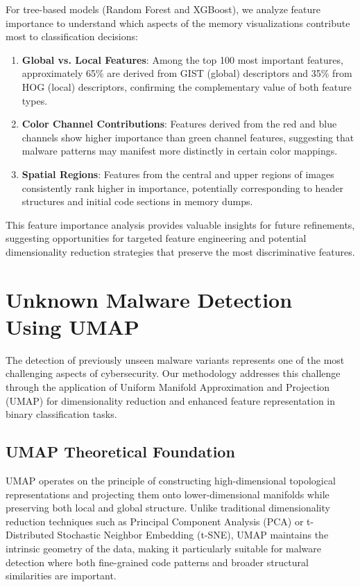 For tree-based models (Random Forest and XGBoost), we analyze feature importance to understand which aspects of the memory visualizations contribute most to classification decisions:

\begin{enumerate}
    \item \textbf{Global vs. Local Features}: Among the top 100 most important features, approximately 65\% are derived from GIST (global) descriptors and 35\% from HOG (local) descriptors, confirming the complementary value of both feature types.
    
    \item \textbf{Color Channel Contributions}: Features derived from the red and blue channels show higher importance than green channel features, suggesting that malware patterns may manifest more distinctly in certain color mappings.
    
    \item \textbf{Spatial Regions}: Features from the central and upper regions of images consistently rank higher in importance, potentially corresponding to header structures and initial code sections in memory dumps.
\end{enumerate}

This feature importance analysis provides valuable insights for future refinements, suggesting opportunities for targeted feature engineering and potential dimensionality reduction strategies that preserve the most discriminative features.

\section{Unknown Malware Detection Using UMAP}
\label{sec:umap-detection}

The detection of previously unseen malware variants represents one of the most challenging aspects of cybersecurity. Our methodology addresses this challenge through the application of Uniform Manifold Approximation and Projection (UMAP) for dimensionality reduction and enhanced feature representation in binary classification tasks.

\subsection{UMAP Theoretical Foundation}
\label{subsec:umap-theory}

UMAP operates on the principle of constructing high-dimensional topological representations and projecting them onto lower-dimensional manifolds while preserving both local and global structure. Unlike traditional dimensionality reduction techniques such as Principal Component Analysis (PCA) or t-Distributed Stochastic Neighbor Embedding (t-SNE), UMAP maintains the intrinsic geometry of the data, making it particularly suitable for malware detection where both fine-grained code patterns and broader structural similarities are important.

